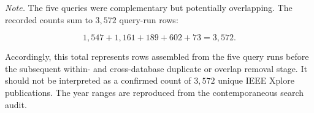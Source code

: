 \documentclass[12pt]{article}
\numberwithin{equation}{section}
\begin{document}
\begin{landscape}
\begin{table}[!p]
\begin{minipage}{\linewidth}
\footnotesize
\textit{Note.}
The five queries were complementary but potentially overlapping. The
recorded counts sum to \(3{,}572\) query-run rows:

\[
1{,}547+1{,}161+189+602+73=3{,}572.
\]

Accordingly, this total represents rows assembled from the five query
runs before the subsequent within- and cross-database duplicate or
overlap removal stage. It should not be interpreted as a confirmed
count of \(3{,}572\) unique IEEE Xplore publications. The year ranges
are reproduced from the contemporaneous search audit.
\end{minipage}


\end{table}
\end{landscape}
\FloatBarrier







\end{document}
